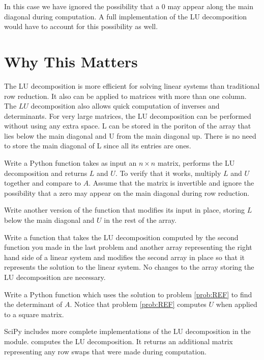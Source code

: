 In this case we have ignored the possibility that a 0 may appear along the main diagonal during computation.
A full implementation of the LU decomposition would have to account for this possibility as well.

\section*{Why This Matters}

The LU decomposition is more efficient for solving linear systems than traditional row reduction.
It also can be applied to matrices with more than one column.
The $LU$ decomposition also allows quick computation of inverses and determinants.
For very large matrices, the LU decomposition can be performed without using any extra space.
L can be stored in the poriton of the array that lies below the main diagonal and U from the main diagonal up.
There is no need to store the main diagonal of L since all its entries are ones.

\begin{problem}
\label{prob:LU}
Write a Python function takes as input an $n\times n$ matrix, performs the LU decomposition and returns $L$ and $U$.
To verify that it works, multiply $L$ and $U$ together and compare to $A$.
Assume that the matrix is invertible and ignore the possibility that a zero may appear on the main diagonal during row reduction.

Write another version of the function that modifies its input in place, storing $L$ below the main diagonal and $U$ in the rest of the array.
\end{problem}

\begin{problem}
Write a function that takes the LU decomposition computed by the second function you made in the last problem and another array representing the right hand side of a linear system and modifies the second array in place so that it represents the solution to the linear system.
No changes to the array storing the LU decomposition are necessary.
\end{problem}

\begin{problem}
\label{prob:det}
Write a Python function which uses the solution to problem \ref{prob:REF} to find the determinant of $A$.
Notice that problem \ref{prob:REF} computes $U$ when applied to a square matrix.
\end{problem}

SciPy includes more complete implementations of the LU decomposition in the  module.
 computes the LU decomposition.
It returns an additional matrix representing any row swaps that were made during computation.


